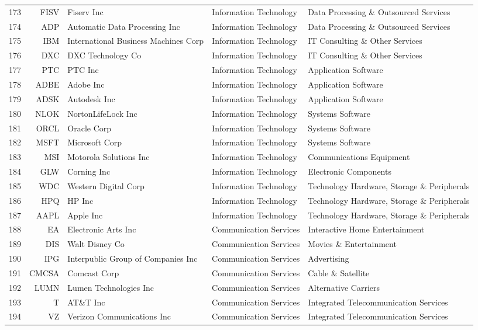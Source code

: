 \documentclass[aps, pra, groupedaddress, showkeys, twocolumn, floatfix, 10pt]{revtex4-2}
\begin{document}
{\begin{longtable}{rrllp{4cm}}
173&FISV&Fiserv Inc&Information Technology&Data Processing \& Outsourced Services \\
174&ADP&Automatic Data Processing Inc&Information Technology&Data Processing \& Outsourced Services \\
175&IBM&International Business Machines Corp&Information Technology&IT Consulting \& Other Services \\
176&DXC&DXC Technology Co&Information Technology&IT Consulting \& Other Services \\
177&PTC&PTC Inc&Information Technology&Application Software \\
178&ADBE&Adobe Inc&Information Technology&Application Software \\
179&ADSK&Autodesk Inc&Information Technology&Application Software \\
180&NLOK&NortonLifeLock Inc&Information Technology&Systems Software \\
181&ORCL&Oracle Corp&Information Technology&Systems Software \\
182&MSFT&Microsoft Corp&Information Technology&Systems Software \\
183&MSI&Motorola Solutions Inc&Information Technology&Communications Equipment \\
184&GLW&Corning Inc&Information Technology&Electronic Components \\
185&WDC&Western Digital Corp&Information Technology&Technology Hardware, Storage \& Peripherals \\
186&HPQ&HP Inc&Information Technology&Technology Hardware, Storage \& Peripherals \\
187&AAPL&Apple Inc&Information Technology&Technology Hardware, Storage \& Peripherals \\
188&EA&Electronic Arts Inc&Communication Services&Interactive Home Entertainment \\
189&DIS&Walt Disney Co&Communication Services&Movies \& Entertainment \\
190&IPG&Interpublic Group of Companies Inc&Communication Services&Advertising \\
191&CMCSA&Comcast Corp&Communication Services&Cable \& Satellite \\
192&LUMN&Lumen Technologies Inc&Communication Services&Alternative Carriers \\
193&T&AT\&T Inc&Communication Services&Integrated Telecommunication Services \\
194&VZ&Verizon Communications Inc&Communication Services&Integrated Telecommunication Services \\

\end{longtable}}
\end{document}
